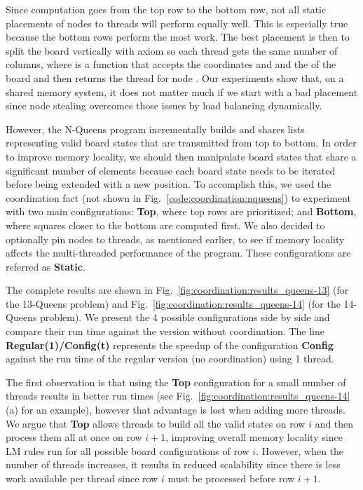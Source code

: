 Since computation goes from the top row to the bottom row, not all static
placements of nodes to threads will perform equally well. This is especially
true because the bottom rows perform the most work.  The best placement is then
to split the board vertically with axiom  so each thread gets the same number of columns, where
 is a function that accepts the coordinates  and 
and the  of the board and then returns the thread for node .
Our experiments show that, on a shared memory system, it does not matter much if
we start with a bad placement since node stealing overcomes those issues by load
balancing dynamically.

However, the N-Queens program incrementally builds and shares lists representing
valid board states that are transmitted from top to bottom. In order to improve
memory locality, we should then manipulate board states that share a significant
number of elements because each board state needs to be iterated before being
extended with a new position. To accomplish this, we used the coordination fact
 (not shown in
Fig.~\ref{code:coordination:nqueens}) to experiment with two main
configurations: \textbf{Top}, where top rows are prioritized; and
\textbf{Bottom}, where squares closer to the bottom are computed first. We also
decided to optionally pin nodes to threads, as mentioned earlier, to see if
memory locality affects the multi-threaded performance of the program. These
configurations are referred as \textbf{Static}.

The complete results are shown in
Fig.~\ref{fig:coordination:results_queens-13} (for the 13-Queens problem) and
Fig.~\ref{fig:coordination:results_queens-14} (for the 14-Queens problem). We
present the 4 possible configurations side by side and compare their run time
against the version without coordination. The line \textbf{Regular(1)/Config(t)}
represents the speedup of the configuration \textbf{Config} against the run
time of the regular version (no coordination) using 1 thread.

The first observation is that using the \textbf{Top} configuration for a small
number of threads results in better run times (see
Fig.~\ref{fig:coordination:results_queens-14}(a) for an example), however that
advantage is lost when adding more threads. We argue that \textbf{Top} allows
threads to build all the valid states on row $i$ and then process them all at
once on row $i+1$, improving overall memory locality since LM rules run for all
possible board configurations of row $i$. However, when the number of threads
increases, it results in reduced scalability since there is less work available
per thread since row $i$ must be processed before row $i+1$.

